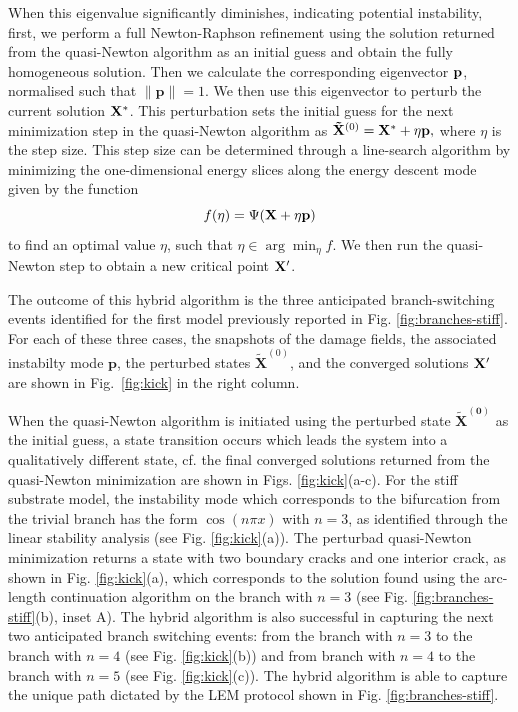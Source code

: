 \documentclass[10pt]{article}
\begin{document}
When this eigenvalue significantly diminishes, indicating potential instability, first, we perform a full Newton-Raphson refinement using the solution returned from the quasi-Newton algorithm as an initial guess and obtain the fully homogeneous solution. Then we calculate the corresponding eigenvector \(\mathbf{p}\), normalised such that $\|\textbf{p}\|=1$. 
We then use this eigenvector to perturb the current solution $\mathbf{X^*}$. This perturbation sets the initial guess for the next minimization step in the quasi-Newton algorithm as $\mathbf{\tilde X}^{(0)} = \mathbf{X^*} + \eta \mathbf{p},
$ where \(\eta\) is the step size.
%
%
This step size can be determined through a line-search algorithm by minimizing the one-dimensional energy slices along the energy descent mode given by the function 
$$f(\eta) = \Psi(\mathbf{X} + \eta \mathbf{p})
\label{eqn:energy-slice}$$
 to find an optimal value \(\eta\), such that $\eta \in \arg \min_{\eta} f$. {We then run the quasi-Newton step to obtain a new critical point $\mathbf{X}'$.}

The outcome of this hybrid algorithm is the three anticipated branch-switching events identified for the first model previously reported in Fig. \ref{fig:branches-stiff}. For each of these three cases, the snapshots of the damage fields, the associated {instabilty mode} \(\mathbf{p}\), the perturbed states \(\mathbf{\tilde X}^{(0)}\), and the converged solutions $\mathbf{X}'$ are shown in Fig.~\ref{fig:kick} in the right column.

When the quasi-Newton algorithm is initiated using the perturbed state \(\mathbf{\tilde X^{(0)}}\)
%
as the initial guess, {a state transition} occurs which leads the system into a qualitatively different state, cf. the final  converged solutions returned from the quasi-Newton minimization are shown in Figs. \ref{fig:kick}(a-c). For the stiff substrate model, the {instability mode} which corresponds to the bifurcation from the trivial branch has the form \(\cos(n\pi x)\) with \(n=3\), as identified through the linear stability analysis (see Fig. \ref{fig:kick}(a)). 
The perturbad quasi-Newton minimization returns a state with two boundary cracks and one interior crack, as shown in Fig. \ref{fig:kick}(a), which corresponds to the solution found using the arc-length continuation algorithm on the branch with \(n=3\) (see Fig. \ref{fig:branches-stiff}(b), inset A).  The hybrid algorithm is also successful in capturing the next two anticipated branch   switching events: from the  branch with \(n=3\)  to the branch  with \(n=4\) (see Fig. \ref{fig:kick}(b)) and  from branch with \(n=4\)  to the branch  with \(n=5\) (see Fig. \ref{fig:kick}(c)). The hybrid algorithm is able to capture the unique path dictated by the LEM protocol shown in Fig. \ref{fig:branches-stiff}.   
\end{document}
